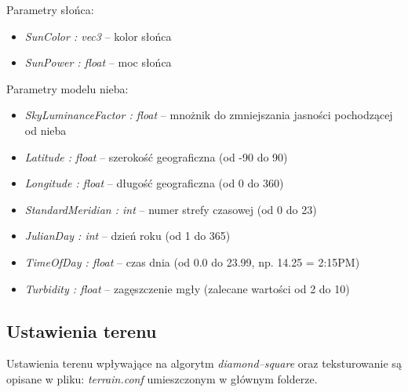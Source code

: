 \documentclass[inz,shortabstract]{iithesis}
\begin{document}
        Parametry słońca:
        \begin{itemize}
            \item \textit{SunColor : vec3} -- kolor słońca 
            \item \textit{SunPower : float} -- moc słońca
        \end{itemize}
        
        Parametry modelu nieba:
        \begin{itemize}
            \item \textit{SkyLuminanceFactor : float} -- mnożnik do zmniejszania jasności pochodzącej od nieba
            \item \textit{Latitude : float} -- szerokość geograficzna (od -90 do 90) 
            \item \textit{Longitude : float} -- długość geograficzna (od 0 do 360)
            \item \textit{StandardMeridian : int} -- numer strefy czasowej (od 0 do 23)
            \item \textit{JulianDay : int} -- dzień roku (od 1 do 365)
            \item \textit{TimeOfDay : float} -- czas dnia (od 0.0 do 23.99, np. 14.25 = 2:15PM) 
            \item \textit{Turbidity : float} -- zagęszczenie mgły (zalecane wartości od 2 do 10)
        \end{itemize}
        
        \subsection{Ustawienia terenu}
        Ustawienia terenu wpływające na algorytm \textit{diamond--square} oraz teksturowanie są opisane w pliku: \textit{terrain.conf} umieszczonym w głównym folderze.
        
\end{document}
